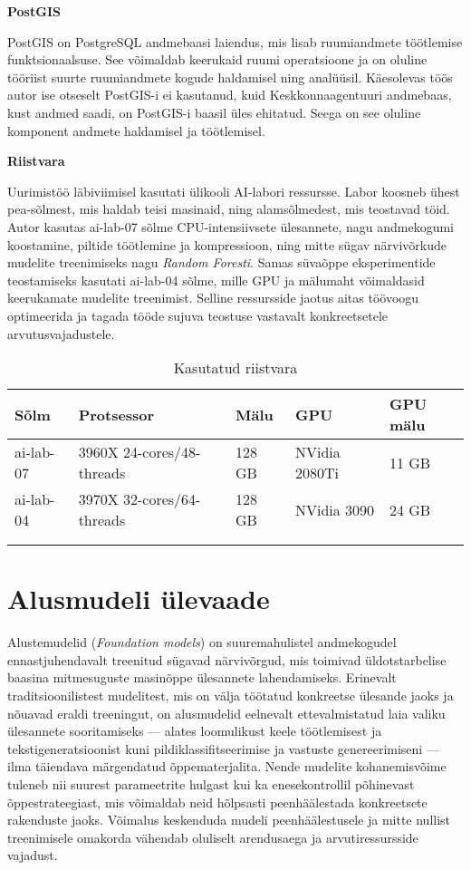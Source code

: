 \textbf{PostGIS}\nopagebreak[4]

PostGIS on PostgreSQL andmebaasi laiendus, mis lisab ruumiandmete töötlemise funktsionaalsuse. See võimaldab keerukaid ruumi operatsioone
ja on oluline tööriist suurte ruumiandmete kogude haldamisel ning
analüüsil. Käesolevas töös autor ise otseselt PostGIS-i ei kasutanud, kuid Keskkonnaagentuuri andmebaas, kust andmed saadi, on PostGIS-i baasil üles ehitatud. Seega on see oluline komponent andmete haldamisel ja töötlemisel.

\textbf{Riistvara}\nopagebreak[4]

Uurimistöö läbiviimisel kasutati ülikooli AI-labori ressursse. Labor koosneb ühest pea-sõlmest, mis haldab teisi masinaid, ning alamsõlmedest, mis teostavad töid. Autor kasutas ai-lab-07 sõlme CPU-intensiivsete ülesannete, nagu andmekogumi koostamine, piltide töötlemine ja kompressioon, ning mitte sügav närvivõrkude mudelite treenimiseks nagu \textit{Random Foresti}. Samas süvaõppe eksperimentide teostamiseks kasutati ai-lab-04 sõlme, mille GPU ja mälumaht võimaldasid keerukamate mudelite treenimist. Selline ressursside jaotus aitas töövoogu optimeerida ja tagada tööde sujuva teostuse vastavalt konkreetsetele arvutusvajadustele.
\begin{longtable}{lllll}
    \hline
    Sõlm & Protsessor & Mälu & GPU & GPU mälu                         \\ 
    \hline
    ai-lab-07 & 3960X 24-cores/48-threads & 128 GB & NVidia 2080Ti & 11 GB    \\
    ai-lab-04 & 3970X 32-cores/64-threads & 128 GB & NVidia 3090 & 24 GB      \\
    &              &                    &                              \\ \hline
    \caption{Kasutatud riistvara}
    \label{tab:hardwareused}
\end{longtable}



\section{Alusmudeli ülevaade}
Alustemudelid (\textit{Foundation models}) on suuremahulistel andmekogudel
ennastjuhendavalt treenitud sügavad närvivõrgud, mis toimivad üldotstarbelise
baasina mitmesuguste masinõppe ülesannete lahendamiseks. Erinevalt
traditsioonilistest mudelitest, mis on välja töötatud konkreetse ülesande jaoks
ja nõuavad eraldi treeningut, on alusmudelid eelnevalt ettevalmistatud laia
valiku ülesannete sooritamiseks --- alates loomulikust keele töötlemisest ja
tekstigeneratsioonist kuni pildiklassifitseerimise ja vastuste genereerimiseni
--- ilma täiendava märgendatud õppematerjalita. Nende mudelite
kohanemisvõime tuleneb nii suurest parameetrite hulgast kui ka enesekontrollil
põhinevast õppestrateegiast, mis võimaldab neid hõlpsasti peenhäälestada
konkreetsete rakenduste jaoks. Võimalus keskenduda mudeli peenhäälestusele ja mitte nullist treenimisele omakorda vähendab oluliselt arendusaega ja arvutiressursside vajadust.
\cite{WhatAreFoundation}

